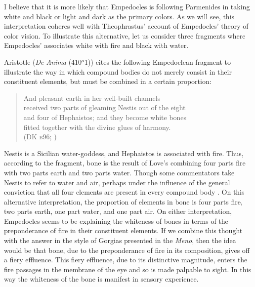 I believe that it is more likely that Empedocles is following Parmenides in taking white and black or light and dark as the primary colors. As we will see, this interpretation coheres well with Theophrastus' account of Empedocles' theory of color vision. To illustrate this alternative, let us consider three fragments where Empedocles' associates white with fire and black with water.


Aristotle (\emph{De Anima} (410\( ^{a} \)1)) cites the following Empedoclean fragment to illustrate the way in which compound bodies do not merely consist in their constituent elements, but must be combined in a certain proportion:
\begin{verse}
    And pleasant earth in her well-built channels\\
    received two parts of gleaming Nestis out of the eight\\
    and four of Hephaistos; and they become white bones\\
    fitted together with the divine glues of harmony.\\
    (DK \textsc{b}96; \citealt[62 245]{Inwood:2001ve})
\end{verse}
Nestis is a Sicilian water-goddess, and Hephaistos is associated with fire. Thus, according to the fragment, bone is the result of Love's combining four parts fire with two parts earth and two parts water. Though some commentators take Nestis to refer to water and air, perhaps under the influence of the general conviction that all four elements are present in every compound body \citep[209 n2]{Wright:1981zr}. On this alternative interpretation, the proportion of elements in bone is four parts fire, two parts earth, one part water, and one part air. On either interpretation, Empedocles seems to be explaining the whiteness of bones in terms of the preponderance of fire in their constituent elements. If we combine this thought with the answer in the style of Gorgias presented in the \emph{Meno}, then the idea would be that bone, due to the preponderance of fire in its composition, gives off a fiery effluence. This fiery effluence, due to its distinctive magnitude, enters the fire passages in the membrane of the eye and so is made palpable to sight. In this way the whiteness of the bone is manifest in sensory experience.

